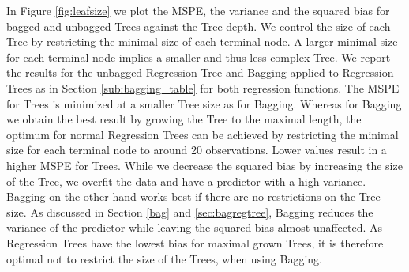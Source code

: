 In Figure \ref{fig:leafsize} we plot the MSPE, the variance and the squared bias for bagged and unbagged Trees against the Tree depth. We control the size of each Tree by restricting the minimal size of each terminal node. A larger minimal size for each terminal node implies a smaller and thus less complex Tree.
We report the results for the unbagged Regression Tree and Bagging applied to Regression Trees as in Section \ref{sub:bagging_table} for both regression functions.
\newline
The MSPE for Trees is minimized at a smaller Tree size as for Bagging. Whereas for Bagging we obtain the best result by growing the Tree to the maximal length, the optimum for normal Regression Trees can be achieved by restricting the minimal size for each terminal node to around 20 observations. Lower values result in a higher MSPE for Trees. While we decrease the squared bias by increasing the size of the Tree, we overfit the data and have a predictor with a high variance. %
Bagging on the other hand works best if there are no restrictions on the Tree size. As discussed in Section \ref{bag} and \ref{sec:bagregtree}, Bagging reduces the variance of the predictor while leaving the squared bias almost unaffected. As Regression Trees have the lowest bias for maximal grown Trees, it is therefore optimal not to restrict the size of the Trees, when using Bagging.
